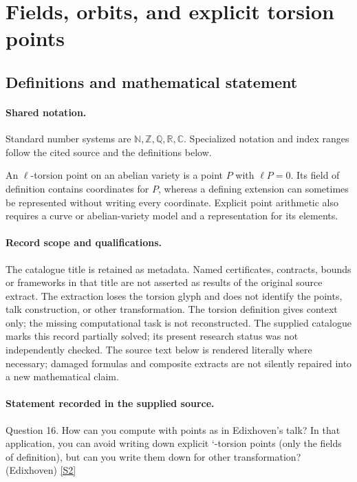 \documentclass[11pt]{article}
\newcommand{\sref}[2]{\hyperlink{source:#1:#2}{[S#2]}}
\begin{document}
\section{Fields, orbits, and explicit torsion points}\label{statement}

\subsection{Definitions and mathematical statement}

\paragraph{Shared notation.}Standard number systems are $\mathbb N,\mathbb Z,\mathbb Q,\mathbb R,\mathbb C$. Specialized notation and index ranges follow the cited source and the definitions below.


An $\ell$-torsion point on an abelian variety is a point $P$ with $\ell P=0$. Its field of definition contains coordinates for $P$, whereas a defining extension can sometimes be represented without writing every coordinate. Explicit point arithmetic also requires a curve or abelian-variety model and a representation for its elements.
\paragraph{Record scope and qualifications.}
The catalogue title is retained as metadata. Named certificates, contracts, bounds or frameworks in that title are not asserted as results of the original source extract.
The extraction loses the torsion glyph and does not identify the points, talk construction, or other transformation. The torsion definition gives context only; the missing computational task is not reconstructed. The supplied catalogue marks this record partially solved; its present research status was not independently checked.
The source text below is rendered literally where necessary; damaged formulas and composite extracts are not silently repaired into a new mathematical claim.
\paragraph{Statement recorded in the supplied source.}
Question 16. How can you compute with points as in Edixhoven's talk? In that application, you can avoid writing down explicit `-torsion points (only the fields of definition), but can you write them down for other transformation? (Edixhoven) \sref{statement}{2}
\end{document}
